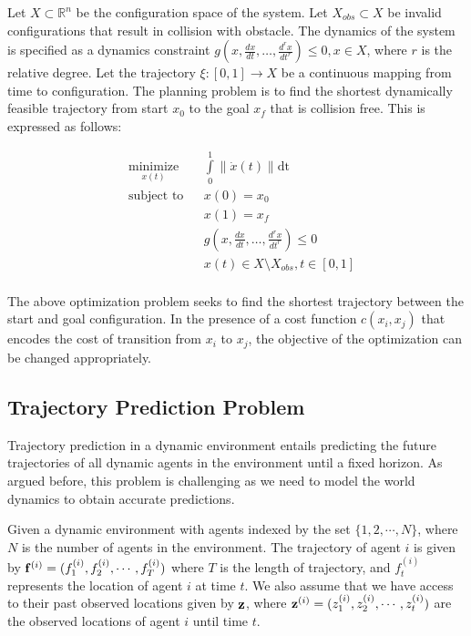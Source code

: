 Let $X \subset \mathbb{R}^n$ be the configuration space of the system. Let $X_{obs} \subset X$ be invalid configurations that result in collision with obstacle. The dynamics of the system is specified as a dynamics constraint $g(x, \frac{dx}{dt}, \dots, \frac{d^rx}{dt^r}) \leq 0, x \in X$, where $r$ is the relative degree. Let the trajectory $\xi: [0, 1] \rightarrow X$ be a continuous mapping from time to configuration. The planning problem is to find the shortest dynamically feasible trajectory from start $x_0$ to the goal $x_f$ that is collision free. This is expressed as follows:

\begin{equation}
\begin{aligned}
\label{eq:planning-problem}
& \underset{x(t)}{\text{minimize}} & & \int\limits_0^1 \| \dot{x}(t) \| \mathrm{dt} \\
& \text{subject to} & & x(0) = x_0 \\
&                   & & x(1) = x_f \\
&                   & & g(x, \frac{dx}{dt}, \dots, \frac{d^rx}{dt^r}) \leq 0 \\
&				    & & x(t) \in X \setminus X_{obs}, t \in [0,1] \\
\end{aligned}
\end{equation}

The above optimization problem seeks to find the shortest trajectory between the start and goal configuration. In the presence of a cost function $c(x_i, x_j)$ that encodes the cost of transition from $x_i$ to $x_j$, the objective of the optimization can be changed appropriately.

\subsection{Trajectory Prediction Problem}
\label{sec:intro-traj-pred-probl}

Trajectory prediction in a dynamic environment entails predicting the future trajectories of all dynamic agents in the environment until a fixed horizon. As argued before, this problem is challenging as we need to model the world dynamics to obtain accurate predictions.

Given a dynamic environment with agents indexed by the set $\{1, 2, \cdots, N\}$, where $N$ is the number of agents in the environment. The trajectory of agent $i$ is given by $\mathbf{f}^{(i)} = (f_1^{(i)}, f_2^{(i)}, \cdots, f_T^{(i)})$ where $T$ is the length of trajectory, and $f_t^{(i)}$ represents the location of agent $i$ at time $t$. We also assume that we have access to their past observed locations given by $\mathbf{z}$, where $\mathbf{z}^{(i)} = (z_1^{(i)}, z_2^{(i)}, \cdots, z_t^{(i)})$ are the observed locations of agent $i$ until time $t$. \\



